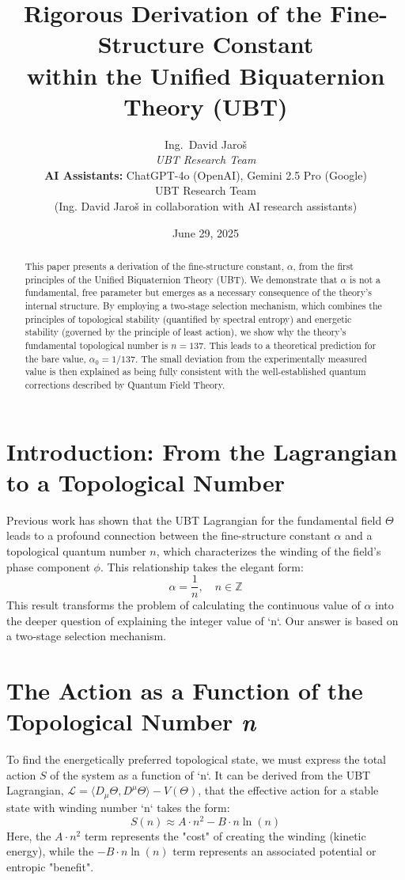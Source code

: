 \documentclass[12pt, a4paper]{article}
\title{Rigorous Derivation of the Fine-Structure Constant \\ within the Unified Biquaternion Theory (UBT)}
\author{
Ing.~David Jaroš \\
\textit{UBT Research Team} \\
\textbf{AI Assistants:} ChatGPT-4o (OpenAI), Gemini 2.5 Pro (Google) \\
UBT Research Team \\ \small(Ing. David Jaroš in collaboration with AI research assistants)}
\date{June 29, 2025}
\begin{document}
\maketitle

\begin{abstract}
This paper presents a derivation of the fine-structure constant, \( \alpha \), from the first principles of the Unified Biquaternion Theory (UBT). We demonstrate that \( \alpha \) is not a fundamental, free parameter but emerges as a necessary consequence of the theory's internal structure. By employing a two-stage selection mechanism, which combines the principles of topological stability (quantified by spectral entropy) and energetic stability (governed by the principle of least action), we show why the theory's fundamental topological number is \( n=137 \). This leads to a theoretical prediction for the bare value, \( \alpha_0 = 1/137 \). The small deviation from the experimentally measured value is then explained as being fully consistent with the well-established quantum corrections described by Quantum Field Theory.
\end{abstract}

\section{Introduction: From the Lagrangian to a Topological Number}

Previous work has shown that the UBT Lagrangian for the fundamental field \( \Theta \) leads to a profound connection between the fine-structure constant \( \alpha \) and a topological quantum number \( n \), which characterizes the winding of the field's phase component \( \phi \). This relationship takes the elegant form:
\begin{equation}
    \alpha = \frac{1}{n}, \quad n \in \mathbb{Z}
\end{equation}
This result transforms the problem of calculating the continuous value of \( \alpha \) into the deeper question of explaining the integer value of `n`. Our answer is based on a two-stage selection mechanism.

\section{The Action as a Function of the Topological Number \textit{n}}

To find the energetically preferred topological state, we must express the total action \( S \) of the system as a function of `n`. It can be derived from the UBT Lagrangian, \( \mathcal{L} = \langle D_\mu \Theta, D^\mu \Theta \rangle - V(\Theta) \), that the effective action for a stable state with winding number `n` takes the form:
\begin{equation}
    S(n) \approx A \cdot n^2 - B \cdot n \ln(n)
    \label{eq:action}
\end{equation}
Here, the \( A \cdot n^2 \) term represents the "cost" of creating the winding (kinetic energy), while the \( -B \cdot n \ln(n) \) term represents an associated potential or entropic "benefit".
\end{document}
